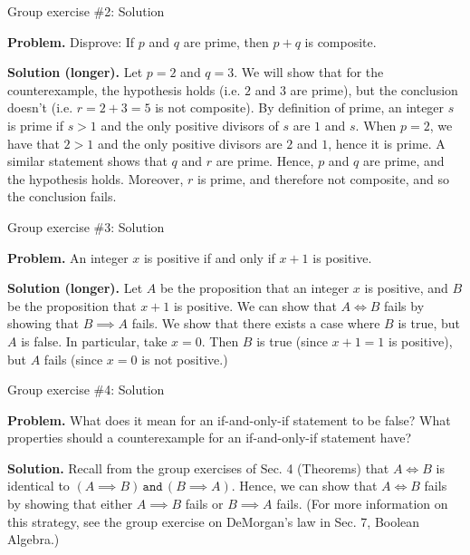 \documentclass[10pt]{beamer}
\begin{document}
\begin{frame}{Group exercise \#2: Solution}

\textbf{Problem.} Disprove: If $p$ and $q$ are prime, then $p+q$ is composite.
\vfill 

\textbf{Solution (longer).}  Let $p=2$ and $q=3$. We will show that for the counterexample, the hypothesis holds (i.e. $2$ and $3$ are prime), but the conclusion doesn't (i.e. $r=2 + 3 = 5$ is not composite).  By definition of prime, an integer $s$ is prime if $s>1$ and the only positive divisors of $s$ are $1$ and $s$.   When $p=2$, we have that $2>1$ and the only positive divisors are $2$ and $1$, hence it is prime.  A similar statement shows that $q$ and $r$ are prime.  Hence, $p$ and $q$ are prime, and the hypothesis holds.  Moreover, $r$ is prime, and therefore not composite, and so the conclusion fails.   
\end{frame}


\begin{frame}{Group exercise \#3: Solution}

\textbf{Problem.} An integer $x$ is positive if and only if $x+1$ is positive.
\vfill 

\textbf{Solution (longer).}  Let $A$ be the proposition that an integer $x$ is positive, and $B$ be the proposition that $x+1$ is positive.  We can show that $A \iff B$ fails by showing that $B \implies A$ fails.   We show that there exists a case where $B$ is true, but $A$ is false.  In particular, take $x=0$. Then $B$ is true (since $x+1=1$ is positive), but $A$ fails (since $x=0$ is not positive.)   
\end{frame}

\begin{frame}{Group exercise \#4: Solution}

\textbf{Problem.} What does it mean for an if-and-only-if statement to be false? What properties should a counterexample for an if-and-only-if statement have?
\vfill 

\textbf{Solution.} Recall from the group exercises of Sec. 4 (Theorems) that $A \iff B$ is identical to $(A \implies B) \, \texttt{and} \, (B \implies A)$.  Hence, we can show that $A \iff B$ fails by showing that either $A \implies B$ fails or $B \implies A$ fails.  (For more information on this strategy, see the group exercise on DeMorgan's law in Sec. 7, Boolean Algebra.)
\end{frame}
\end{document}
